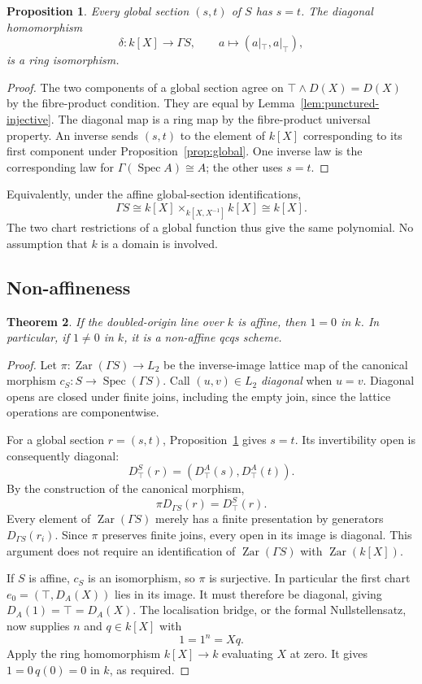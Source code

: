 \documentclass[11pt]{amsart}
\newtheorem{theorem}{Theorem}[section]
\newtheorem{proposition}[theorem]{Proposition}
\theoremstyle{definition}
\theoremstyle{remark}
\newcommand{\Zar}{\operatorname{Zar}}
\newcommand{\Spec}{\operatorname{Spec}}
\begin{document}
\begin{proposition}\label{prop:double-global}
Every global section $(s,t)$ of $S$ has $s=t$. The diagonal homomorphism
\[
 \delta:k[X]\longrightarrow\Gamma S,\qquad
 a\longmapsto(a|_\top,a|_\top),
\]
is a ring isomorphism.
\end{proposition}
\begin{proof}
The two components of a global section agree on
$\top\wedge D(X)=D(X)$ by the fibre-product condition. They are equal by
Lemma~\ref{lem:punctured-injective}. The diagonal map is a ring map by
the fibre-product universal property. An inverse sends $(s,t)$ to the
element of $k[X]$ corresponding to its first component under
Proposition~\ref{prop:global}. One inverse law is the corresponding law
for $\Gamma(\Spec A)\cong A$; the other uses $s=t$.
\end{proof}

Equivalently, under the affine global-section identifications,
\[
 \Gamma S\cong k[X]\times_{k[X,X^{-1}]}k[X]\cong k[X].
\]
The two chart restrictions of a global function thus give the same
polynomial. No assumption that $k$ is a domain is involved.

\subsection{Non-affineness}

\begin{theorem}\label{thm:double-not-affine}
If the doubled-origin line over $k$ is affine, then $1=0$ in $k$.
In particular, if $1\ne0$ in $k$, it is a non-affine qcqs scheme.
\end{theorem}
\begin{proof}
Let $\pi:\Zar(\Gamma S)\to L_2$ be the inverse-image lattice map of
the canonical morphism $c_S:S\to\Spec(\Gamma S)$. Call $(u,v)\in L_2$
\emph{diagonal} when $u=v$. Diagonal opens are closed under finite joins,
including the empty join, since the lattice operations are componentwise.

For a global section $r=(s,t)$, Proposition~\ref{prop:double-global}
gives $s=t$. Its invertibility open is consequently diagonal:
\[
 D^S_\top(r)=(D^A_\top(s),D^A_\top(t)).
\]
By the construction of the canonical morphism,
\[
 \pi D_{\Gamma S}(r)=D^S_\top(r).
\]
Every element of $\Zar(\Gamma S)$ merely has a finite presentation by
generators $D_{\Gamma S}(r_i)$. Since $\pi$ preserves finite joins,
every open in its image is diagonal. This argument does not require an
identification of $\Zar(\Gamma S)$ with $\Zar(k[X])$.

If $S$ is affine, $c_S$ is an isomorphism, so $\pi$ is surjective. In
particular the first chart $e_0=(\top,D_A(X))$ lies in its image. It must
therefore be diagonal, giving $D_A(1)=\top=D_A(X)$. The localisation
bridge, or the formal Nullstellensatz, now supplies $n$ and $q\in k[X]$
with
\[
 1=1^n=Xq.
\]
Apply the ring homomorphism $k[X]\to k$ evaluating $X$ at zero. It gives
$1=0\,q(0)=0$ in $k$, as required.
\end{proof}
\end{document}
